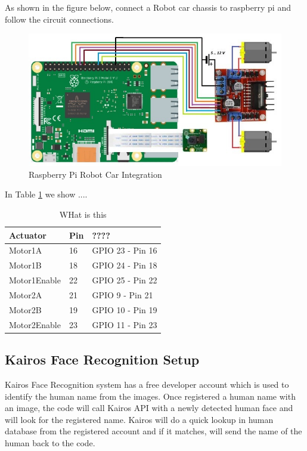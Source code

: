 \documentclass[sigconf]{acmart}
\begin{document}
As shown in the figure below, connect a Robot car chassis to raspberry pi and follow the circuit connections.

\begin{figure}[ht!]
  \includegraphics[width=\columnwidth]{images/RaspPi_Robot.jpg}
  \caption{Raspberry Pi Robot Car Integration}
\end{figure}

In Table \ref{T:pinlayout} we show ....

\begin{table}[htb]
\caption{WHat is this}\label{T:pinlayout}
\begin{tabular}{lll}
Actuator & Pin & ???? \\
\hline
    Motor1A & 16 & GPIO 23 - Pin 16 \\
    Motor1B & 18 & GPIO 24 - Pin 18 \\
    Motor1Enable & 22 & GPIO 25 - Pin 22 \\
    Motor2A & 21 & GPIO 9 - Pin 21 \\
    Motor2B & 19 & GPIO 10 - Pin 19 \\
    Motor2Enable & 23 & GPIO 11 - Pin 23 \\
\end{tabular}
\end{table}

\subsection{Kairos Face Recognition Setup}
Kairos Face Recognition system has a free developer account which is used to identify the human name from the images. Once registered a human name with an image, the code will call Kairos API with a newly detected human face and will look for the registered name. Kairos will do a quick lookup in human database from the registered account and if it matches, will send the name of the human back to the code.
\end{document}
